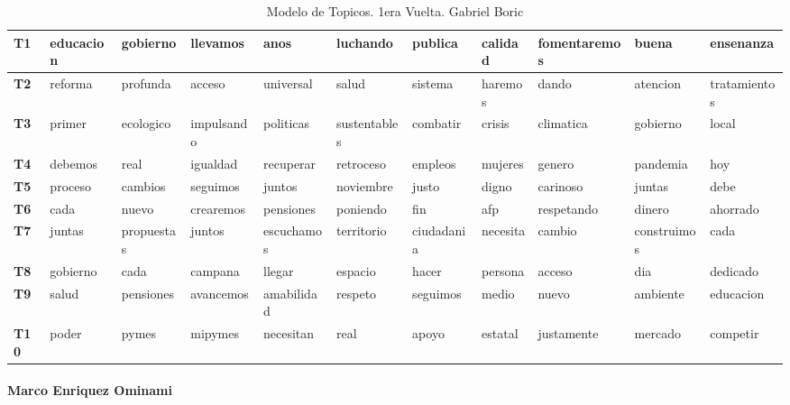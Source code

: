 \documentclass[
  10pt,
  letterpaper,
]{report}
\begin{document}
\begin{table}[!h]

\caption{\label{tab:Tabla1_Boric}Modelo de Topicos. 1era Vuelta. Gabriel Boric}
\centering
\fontsize{6}{8}\selectfont
\begin{tabular}[t]{>{\raggedright\arraybackslash}p{0.08in}|>{\raggedright\arraybackslash}p{0.4in}|>{\raggedright\arraybackslash}p{0.4in}|>{\raggedright\arraybackslash}p{0.4in}|>{\raggedright\arraybackslash}p{0.4in}|>{\raggedright\arraybackslash}p{0.4in}|>{\raggedright\arraybackslash}p{0.4in}|>{\raggedright\arraybackslash}p{0.4in}|>{\raggedright\arraybackslash}p{0.4in}|>{\raggedright\arraybackslash}p{0.4in}|l}
\hline
T1 & educacion & gobierno & llevamos & anos & luchando & publica & calidad & fomentaremos & buena & ensenanza\\
\hline
\textbf{T2} & reforma & profunda & acceso & universal & salud & sistema & haremos & dando & atencion & tratamientos\\
\hline
\textbf{T3} & primer & ecologico & impulsando & politicas & sustentables & combatir & crisis & climatica & gobierno & local\\
\hline
\textbf{T4} & debemos & real & igualdad & recuperar & retroceso & empleos & mujeres & genero & pandemia & hoy\\
\hline
\textbf{T5} & proceso & cambios & seguimos & juntos & noviembre & justo & digno & carinoso & juntas & debe\\
\hline
\textbf{T6} & cada & nuevo & crearemos & pensiones & poniendo & fin & afp & respetando & dinero & ahorrado\\
\hline
\textbf{T7} & juntas & propuestas & juntos & escuchamos & territorio & ciudadania & necesita & cambio & construimos & cada\\
\hline
\textbf{T8} & gobierno & cada & campana & llegar & espacio & hacer & persona & acceso & dia & dedicado\\
\hline
\textbf{T9} & salud & pensiones & avancemos & amabilidad & respeto & seguimos & medio & nuevo & ambiente & educacion\\
\hline
\textbf{T10} & poder & pymes & mipymes & necesitan & real & apoyo & estatal & justamente & mercado & competir\\
\hline
\end{tabular}
\end{table}

\hypertarget{marco-enriquez-ominami}{%
\paragraph{Marco Enriquez Ominami}\label{marco-enriquez-ominami}}
\end{document}
